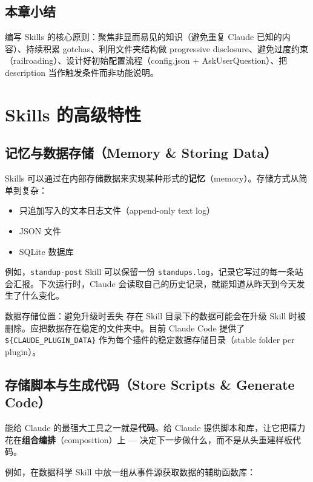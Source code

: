 \documentclass[a4paper]{article}
\begin{document}
\subsection{本章小结}

编写 Skills 的核心原则：聚焦非显而易见的知识（避免重复 Claude 已知的内容）、持续积累 gotchas、利用文件夹结构做 progressive disclosure、避免过度约束（railroading）、设计好初始配置流程（config.json + AskUserQuestion）、把 description 当作触发条件而非功能说明。

\section{Skills 的高级特性}

\subsection{记忆与数据存储（Memory \& Storing Data）}

Skills 可以通过在内部存储数据来实现某种形式的\textbf{记忆}（memory）。存储方式从简单到复杂：
\begin{itemize}
    \item 只追加写入的文本日志文件（append-only text log）
    \item JSON 文件
    \item SQLite 数据库
\end{itemize}

例如，\texttt{standup-post} Skill 可以保留一份 \texttt{standups.log}，记录它写过的每一条站会汇报。下次运行时，Claude 会读取自己的历史记录，就能知道从昨天到今天发生了什么变化。

\begin{warningbox}{数据存储位置：避免升级时丢失}
存在 Skill 目录下的数据可能会在升级 Skill 时被删除。应把数据存在稳定的文件夹中。目前 Claude Code 提供了 \texttt{\$\{CLAUDE\_PLUGIN\_DATA\}} 作为每个插件的稳定数据存储目录（stable folder per plugin）。
\end{warningbox}

\subsection{存储脚本与生成代码（Store Scripts \& Generate Code）}

能给 Claude 的最强大工具之一就是\textbf{代码}。给 Claude 提供脚本和库，让它把精力花在\textbf{组合编排}（composition）上 --- 决定下一步做什么，而不是从头重建样板代码。

例如，在数据科学 Skill 中放一组从事件源获取数据的辅助函数库：
\end{document}
